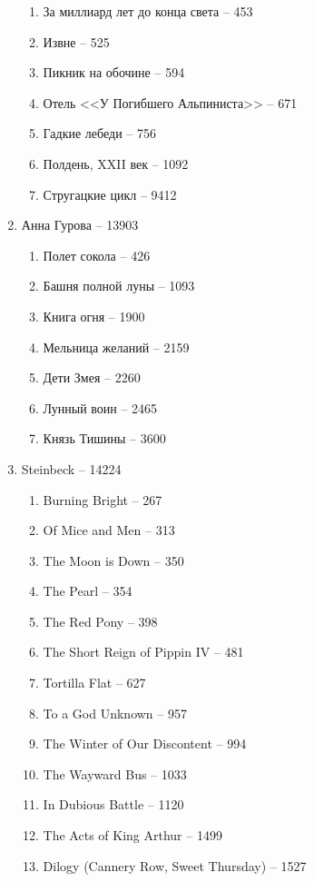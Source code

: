 \documentclass[a4paper, 11pt]{proc} %
\begin{document}
\begin{enumerate}
\begin{enumerate}
            \item За миллиард лет до конца света -- 453
            \item Извне -- 525
            \item Пикник на обочине -- 594
            \item Отель <<У Погибшего Альпиниста>> -- 671
            \item Гадкие лебеди -- 756
            \item Полдень, XXII век -- 1092
            \item Стругацкие цикл -- 9412
        \end{enumerate}
    \item Анна Гурова -- 13903
        \begin{enumerate}
            \item Полет сокола -- 426
            \item Башня полной луны -- 1093
            \item Книга огня -- 1900
            \item Мельница желаний -- 2159
            \item Дети Змея -- 2260
            \item Лунный воин -- 2465
            \item Князь Тишины -- 3600
        \end{enumerate}
    \item Steinbeck -- 14224
        \begin{enumerate}
            \item Burning Bright -- 267
            \item Of Mice and Men -- 313
            \item The Moon is Down -- 350
            \item The Pearl -- 354
            \item The Red Pony -- 398
            \item The Short Reign of Pippin IV -- 481
            \item Tortilla Flat -- 627
            \item To a God Unknown -- 957
            \item The Winter of Our Discontent -- 994
            \item The Wayward Bus -- 1033
            \item In Dubious Battle -- 1120
            \item The Acts of King Arthur -- 1499
            \item Dilogy (Cannery Row, Sweet Thursday) -- 1527

\end{enumerate}
\end{enumerate}
\end{document}
